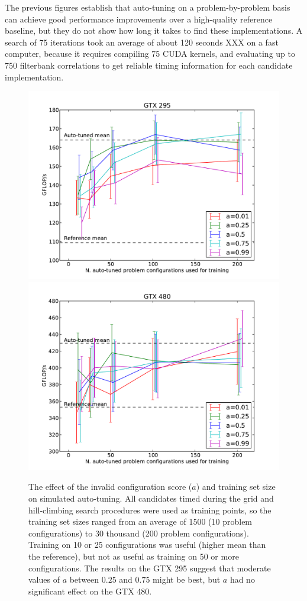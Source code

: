 \documentclass{sig-alternate}
\begin{document}
The previous figures establish that auto-tuning on a problem-by-problem basis
can achieve good performance improvements over a high-quality reference
baseline, but they do not show how long it takes to find these implementations.
A search of 75 iterations took an average of about 120 seconds XXX on a fast
computer, because it requires compiling 75 CUDA kernels, and evaluating up to
750 filterbank correlations to get reliable timing information for each
candidate implementation.



\begin{figure}
\centering
\includegraphics[scale=.42]{fig_ntrain_295.pdf} %
\includegraphics[scale=.42]{fig_ntrain_480.pdf} %
\caption{The effect of the invalid configuration score ($a$) and training set
size on simulated auto-tuning.
All candidates timed during the grid and
hill-climbing search procedures were used as training points, so the training
set sizes ranged from an average of 1500 (10 problem configurations) to 30
thousand (200 problem configurations).
Training on 10 or 25 configurations was useful (higher mean than the reference),
but not as useful as training on 50 or more configurations.
The results on the GTX 295 suggest that
moderate values of $a$ between $0.25$ and $0.75$ might be
best, but $a$ had no significant effect on the GTX 480.
}
\label{fig:fig_ntrain}
\end{figure}
\end{document}
